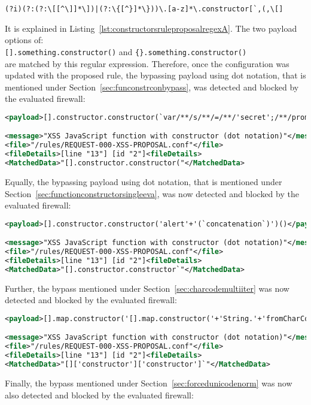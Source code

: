 \begin{lstlisting}[style=basicStyle]
(?i)(?:(?:\[[^\]]*\])|(?:\{[^}]*\}))\.[a-z]*\.constructor[`,(,\[]
\end{lstlisting}
It is explained in Listing~\ref{lst:constructorsruleproposalregexA}.
The two payload options of: \\
\verb|[].something.constructor()| and \verb|{}.something.constructor()| \\
are matched by this regular expression. Therefore, once the configuration was updated with the proposed rule, the bypassing payload using dot notation, that is mentioned under Section~\ref{sec:funconstrconbypass}, was detected and blocked by the evaluated firewall:

\begin{lstlisting}[style=ruleStyle, language=XML, label={lst:constructorsblockedpoc}, caption=Function() constructor + string concatenation bypass in dot notation blocked]
<payload>[].constructor.constructor(`var/**/s/**/=/**/'secret';/**/promp`/**/+/**/`t(s,/**/s)`)()</payload>

<message>"XSS JavaScript function with constructor (dot notation)"</message>
<file>"/rules/REQUEST-000-XSS-PROPOSAL.conf"</file>
<fileDetails>[line "13"] [id "2"]<fileDetails>
<MatchedData>"[].constructor.constructor("</MatchedData>
\end{lstlisting}
Equally, the bypassing payload using dot notation, that is mentioned under Section~\ref{sec:functionconstructorsingleeva}, was now detected and blocked by the evaluated firewall:

\begin{lstlisting}[style=ruleStyle, language=XML, caption=Function() constructor bypass blocked]
<payload>[].constructor.constructor('alert'+'(`concatenation`)')()</payload>

<message>"XSS JavaScript function with constructor (dot notation)"</message>
<file>"/rules/REQUEST-000-XSS-PROPOSAL.conf"</file>
<fileDetails>[line "13"] [id "2"]<fileDetails>
<MatchedData>"[].constructor.constructor`"</MatchedData>
\end{lstlisting}
Further, the bypass mentioned under Section~\ref{sec:charcodemultiiter} was now detected and blocked by the evaluated firewall:

\begin{lstlisting}[style=ruleStyle, language=XML, caption=fromCharCode() bypass blocked]
<payload>[].map.constructor('[].map.constructor('+'String.'+'fromCharCode(0x61,108,0x65,114,116,0x28,96,120,115,115,0x60,0x29)'+')();')();</payload>

<message>"XSS JavaScript function with constructor (dot notation)"</message>
<file>"/rules/REQUEST-000-XSS-PROPOSAL.conf"</file>
<fileDetails>[line "13"] [id "2"]<fileDetails>
<MatchedData>"[]['constructor']['constructor']`"</MatchedData>
\end{lstlisting}
Finally, the bypass mentioned under Section~\ref{sec:forcedunicodenorm} was now also detected and blocked by the evaluated firewall:

